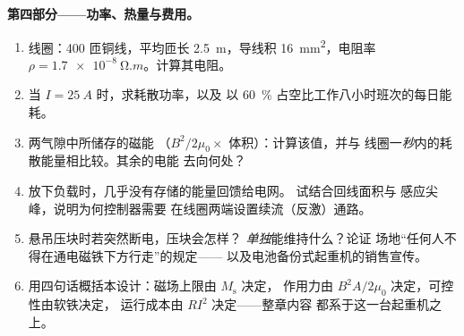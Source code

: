 \begin{problem}
\medskip\noindent\textbf{第四部分——功率、热量与费用。}

\begin{enumerate}[resume]
  \item 线圈：400 匝铜线，平均匝长
        \qty{2.5}{m}，导线积 \qty{16}{mm^2}，电阻率
        $\rho = \qty{1.7e-8}{\ohm.m}$。计算其电阻。
  \item 当 $I = \qty{25}{A}$ 时，求耗散功率，以及
        以 \qty{60}{\percent} 占空比工作八小时班次的每日能耗。
  \item 两气隙中所储存的磁能
        （$B^2/2\mu_0 \times$ 体积）：计算该值，并与
        线圈一\emph{秒}内的耗散能量相比较。其余的电能
        去向何处？
  \item 放下负载时，几乎没有存储的能量回馈给电网。
        试结合回线面积与
        感应尖峰，说明为何控制器需要
        在线圈两端设置续流（反激）通路。
  \item 悬吊压块时若突然断电，压块会怎样？
        \emph{单独}能维持什么？论证
        场地“任何人不得在通电磁铁下方行走”的规定——
        以及电池备份式起重机的销售宣传。
  \item 用四句话概括本设计：磁场上限由 $M_{\text{s}}$ 决定，
        作用力由 $B^2A/2\mu_0$ 决定，可控性由软铁决定，
        运行成本由 $RI^2$ 决定——整章内容
        都系于这一台起重机之上。
\end{enumerate}
\end{problem}
